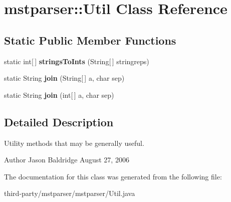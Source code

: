 \hypertarget{classmstparser_1_1Util}{
\section{mstparser::Util Class Reference}
\label{classmstparser_1_1Util}
}
\subsection*{Static Public Member Functions}
\begin{DoxyCompactItemize}
\item 
\hypertarget{classmstparser_1_1Util_a7a473324f6e2375cfc8b39144a5c0629}{
static int\mbox{[}$\,$\mbox{]} {\bfseries stringsToInts} (String\mbox{[}$\,$\mbox{]} stringreps)}
\label{classmstparser_1_1Util_a7a473324f6e2375cfc8b39144a5c0629}

\item 
\hypertarget{classmstparser_1_1Util_ae2da872b0e350f09072aac698b416319}{
static String {\bfseries join} (String\mbox{[}$\,$\mbox{]} a, char sep)}
\label{classmstparser_1_1Util_ae2da872b0e350f09072aac698b416319}

\item 
\hypertarget{classmstparser_1_1Util_ab56f5be083fc631bb0eeb8e4b95a2e83}{
static String {\bfseries join} (int\mbox{[}$\,$\mbox{]} a, char sep)}
\label{classmstparser_1_1Util_ab56f5be083fc631bb0eeb8e4b95a2e83}

\end{DoxyCompactItemize}


\subsection{Detailed Description}
Utility methods that may be generally useful.

\begin{DoxyAuthor}{Author}
Jason Baldridge  August 27, 2006 
\end{DoxyAuthor}


The documentation for this class was generated from the following file:\begin{DoxyCompactItemize}
\item 
third-\/party/mstparser/mstparser/Util.java\end{DoxyCompactItemize}
